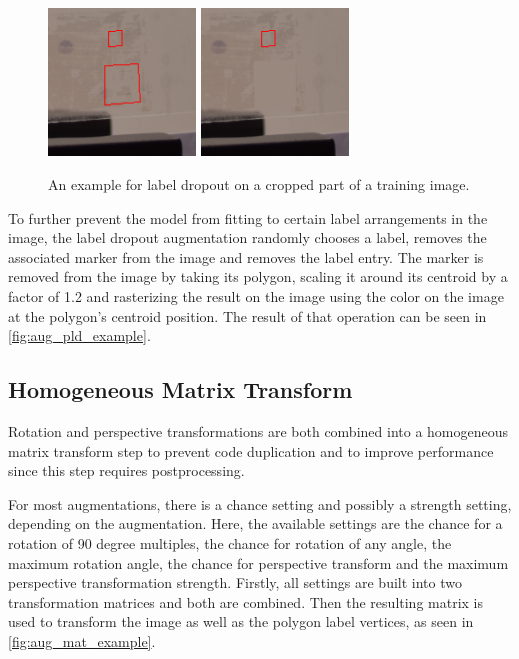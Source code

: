 \documentclass[10pt]{book}
\newcommand{\figureref}[1]{\autoref{#1}}
\begin{document}
\begin{figure}
  \centering
     {\includegraphics[width=0.35\textwidth]{image/aug_pld_before}}
     {\includegraphics[width=0.35\textwidth]{image/aug_pld_after}}
  \caption{An example for label dropout on a cropped part of a training image.}
  \label{fig:aug_pld_example}
\end{figure}

To further prevent the model from fitting to certain label arrangements in the image, the label dropout augmentation randomly chooses a label, removes the associated marker from the image and removes the label entry. The marker is removed from the image by taking its polygon, scaling it around its centroid by a factor of 1.2 and rasterizing the result on the image using the color on the image at the polygon's centroid position. The result of that operation can be seen in \figureref{fig:aug_pld_example}.

\subsection{Homogeneous Matrix Transform}

Rotation and perspective transformations are both combined into a homogeneous matrix transform step to prevent code duplication and to improve performance since this step requires postprocessing.

For most augmentations, there is a chance setting and possibly a strength setting, depending on the augmentation. Here, the available settings are the chance for a rotation of 90 degree multiples, the chance for rotation of any angle, the maximum rotation angle, the chance for perspective transform and the maximum perspective transformation strength. Firstly, all settings are built into two transformation matrices and both are combined. Then the resulting matrix is used to transform the image as well as the polygon label vertices, as seen in \figureref{fig:aug_mat_example}.
\end{document}
